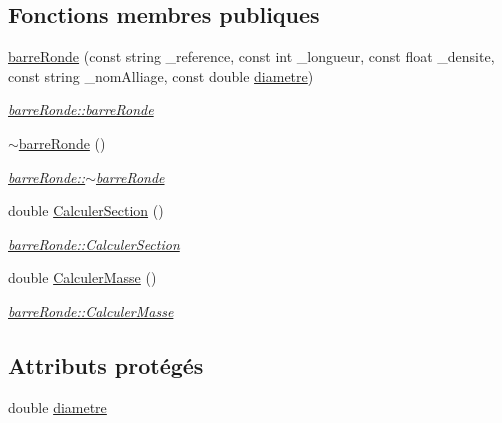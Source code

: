 \subsection*{Fonctions membres publiques}
\begin{DoxyCompactItemize}
\item 
\hyperlink{classbarre_ronde_afde29e31ebfa5236624fb74205cdc487}{barre\+Ronde} (const string \+\_\+reference, const int \+\_\+longueur, const float \+\_\+densite, const string \+\_\+nom\+Alliage, const double \hyperlink{classbarre_ronde_a351f886cdb9bd89132c1ae839f1e9f2e}{diametre})
\begin{DoxyCompactList}\small\item\em \hyperlink{classbarre_ronde_afde29e31ebfa5236624fb74205cdc487}{barre\+Ronde\+::barre\+Ronde} \end{DoxyCompactList}\item 
\hyperlink{classbarre_ronde_ad297441fd7476ed15d45dc0030207125}{$\sim$barre\+Ronde} ()
\begin{DoxyCompactList}\small\item\em \hyperlink{classbarre_ronde_ad297441fd7476ed15d45dc0030207125}{barre\+Ronde\+::$\sim$barre\+Ronde} \end{DoxyCompactList}\item 
double \hyperlink{classbarre_ronde_aab6bddac0a3e8b9eb43d35903f5b4bc4}{Calculer\+Section} ()
\begin{DoxyCompactList}\small\item\em \hyperlink{classbarre_ronde_aab6bddac0a3e8b9eb43d35903f5b4bc4}{barre\+Ronde\+::\+Calculer\+Section} \end{DoxyCompactList}\item 
double \hyperlink{classbarre_ronde_aca5b7e7ce02356570eb86d048788e076}{Calculer\+Masse} ()
\begin{DoxyCompactList}\small\item\em \hyperlink{classbarre_ronde_aca5b7e7ce02356570eb86d048788e076}{barre\+Ronde\+::\+Calculer\+Masse} \end{DoxyCompactList}\end{DoxyCompactItemize}
\subsection*{Attributs protégés}
\begin{DoxyCompactItemize}
\item 
double \hyperlink{classbarre_ronde_a351f886cdb9bd89132c1ae839f1e9f2e}{diametre}
\end{DoxyCompactItemize}


